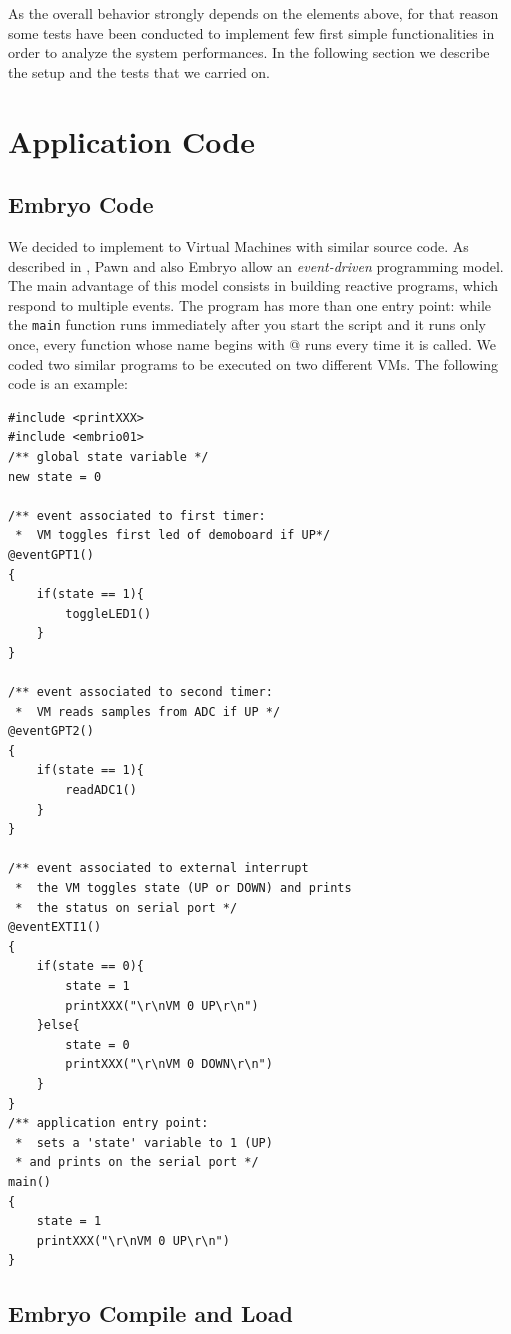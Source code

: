 \documentclass[a4paper,10pt]{article}
\begin{document}
\begin{multicols}{2}
As the overall behavior strongly depends on the elements above, for that reason some tests have been conducted to implement few first simple functionalities in order to analyze the system performances. In the following section we describe the setup and the tests that we carried on.


\section{Application Code}

\subsection{Embryo Code}

We decided to implement to Virtual Machines with similar source code. As described in \cite{pawnGuide}, Pawn and also Embryo allow an \textit{event-driven} programming model. The main advantage of this model consists in building reactive programs, which respond to multiple events. The program has more than one entry point: while the \texttt{main} function runs immediately after you start the script and it runs only once, every function whose name begins with @ runs every time it is called. We coded two similar programs to be executed on two different VMs. The following code is an example:
\bigskip
\begin{lstlisting}[caption={EmbrIO first VM}]
#include <printXXX>
#include <embrio01>
/** global state variable */
new state = 0

/** event associated to first timer:
 *  VM toggles first led of demoboard if UP*/
@eventGPT1()
{
	if(state == 1){
		toggleLED1()
	}
}

/** event associated to second timer:
 *  VM reads samples from ADC if UP */
@eventGPT2()
{
	if(state == 1){
		readADC1()
	}
}

/** event associated to external interrupt
 *  the VM toggles state (UP or DOWN) and prints
 *  the status on serial port */
@eventEXTI1()
{
	if(state == 0){
		state = 1
		printXXX("\r\nVM 0 UP\r\n")
	}else{
		state = 0
		printXXX("\r\nVM 0 DOWN\r\n")
	}
}
/** application entry point:
 *  sets a 'state' variable to 1 (UP)
 * and prints on the serial port */
main()
{
	state = 1
    printXXX("\r\nVM 0 UP\r\n")
}
\end{lstlisting}

\subsection{Embryo Compile and Load}


\end{multicols}
\end{document}
